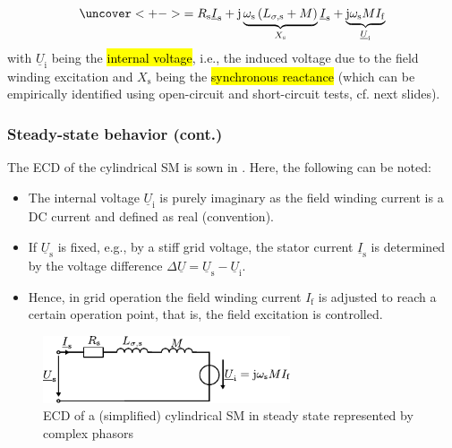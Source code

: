\begin{frame}
\begin{equation}
\begin{split}
			\uncover<+->{= R_\mathrm{s} \underline{I}_\mathrm{s} + \mathrm{j} \underbrace{\omega_\mathrm{s} \left(L_{\sigma,\mathrm{s}} + M\right)}_{X_\mathrm{s}}\underline{I}_\mathrm{s} + \underbrace{\mathrm{j}\omega_\mathrm{s} M I_\mathrm{f}}_{\underline{U}_\mathrm{i}}}
		\end{split}
		\label{eq:SM_voltage_steady_state}
	\end{equation}
	\onslide<+->
	with $\underline{U}_\mathrm{i}$ being the \hl{internal voltage}, i.e., the induced voltage due to the field winding excitation and $X_\mathrm{s}$ being the \hl{synchronous reactance} (which can be empirically identified using open-circuit and short-circuit tests, cf. next slides).
\end{frame}

\begin{frame}
	\frametitle{Steady-state behavior (cont.)} 
	The ECD of the cylindrical SM is sown in . \onslide<2->Here, the following can be noted:
	\begin{itemize}
		\item<2-> The internal voltage $\underline{U}_\mathrm{i}$ is purely imaginary as the field winding current is a DC current and defined as real (convention).
		\item<3-> If $\underline{U}_\mathrm{s}$ is fixed, e.g., by a stiff grid voltage, the stator current $\underline{I}_\mathrm{s}$ is determined by the voltage difference $\Delta\underline{U} = \underline{U}_\mathrm{s} - \underline{U}_\mathrm{i}$.
		\item<4-> Hence, in grid operation the field winding current $I_\mathrm{f}$ is adjusted to reach a certain operation point, that is, the field excitation is controlled.
	\end{itemize}
    \begin{figure}
        \centering
        \includegraphics[width=0.65\textwidth]{fig/lec07/SM_ECD_steady_state.pdf}
        \caption{ECD of a (simplified) cylindrical SM in steady state represented by complex phasors}
        \label{fig:SM_ECD_steady_state}
    \end{figure}
\end{frame}

